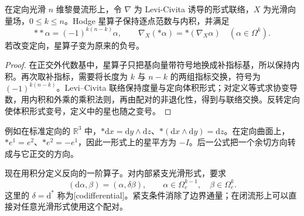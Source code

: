 \begin{proposition}\label{g3:prop:hodge-star-identities}
	在定向光滑 \(n\) 维黎曼流形上，令 \(\nabla\) 为 Levi-Civita 诱导的形式联络，\(X\) 为光滑向量场，\(0\le k\le n\)。Hodge 星算子保持逐点范数与内积，并满足
	\begin{equation}\label{g3:eq:hodge-star-square}
		**\alpha=(-1)^{k(n-k)}\alpha,\qquad
		\nabla_X(*\alpha)=*(\nabla_X\alpha)
		\quad(\alpha\in\Omega^k).
	\end{equation}
	若改变定向，星算子变为原来的负号。
\end{proposition}
\begin{proof}
	在正交外代数基中，星算子只把基向量带符号地换成补指标基，所以保持内积。再次取补指标，需要将长度为 \(k\) 与 \(n-k\) 的两组指标交换，符号为 \((-1)^{k(n-k)}\)。Levi--Civita 联络保持度量与定向体积形式；对定义等式求协变导数，用内积和外乘的乘积法则，再由配对的非退化性，得到与联络交换。反转定向使体积形式变号，定义中的星也随之变号。
\end{proof}

例如在标准定向的 \(\mathbb R^3\) 中，\(*\mathrm dx=\mathrm dy\wedge\mathrm dz\)、\(*(\mathrm dx\wedge\mathrm dy)=\mathrm dz\)。在定向曲面上，\(*e^1=e^2\)、\(*e^2=-e^1\)，因此一形式上的星平方为 \(-I\)。后一公式把一个余切方向转成与它正交的方向。

\ProseParagraphBreak

现在用积分定义反向的一阶算子。对内部紧支光滑形式，要求
\[
	(\mathrm d\alpha,\beta)=(\alpha,\delta\beta),
	\qquad \alpha\in\Omega_c^{k-1},\quad\beta\in\Omega_c^k.
\]
这里的 \(\delta=\mathrm d^*\) 称为[codifferential]。紧支条件消除了边界通量；在闭流形上可以直接对任意光滑形式使用这个配对。


